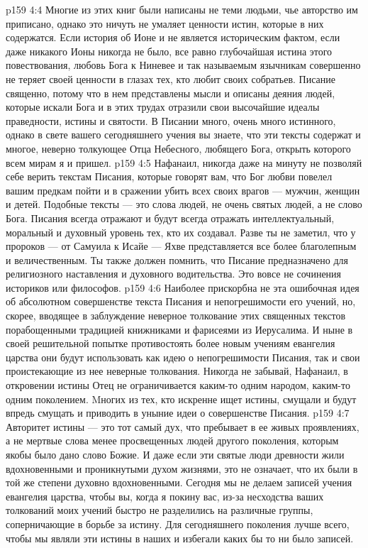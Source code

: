 \vs p159 4:4 Многие из этих книг были написаны не теми людьми, чье авторство им приписано, однако это ничуть не умаляет ценности истин, которые в них содержатся. Если история об Ионе и не является историческим фактом, если даже никакого Ионы никогда не было, все равно глубочайшая истина этого повествования, любовь Бога к Ниневее и так называемым язычникам совершенно не теряет своей ценности в глазах тех, кто любит своих собратьев. Писание священно, потому что в нем представлены мысли и описаны деяния людей, которые искали Бога и в этих трудах отразили свои высочайшие идеалы праведности, истины и святости. В Писании много, очень много истинного, однако в свете вашего сегодняшнего учения вы знаете, что эти тексты содержат и многое, неверно толкующее Отца Небесного, любящего Бога, открыть которого всем мирам я и пришел.
\vs p159 4:5 Нафанаил, никогда даже на минуту не позволяй себе верить текстам Писания, которые говорят вам, что Бог любви повелел вашим предкам пойти и в сражении убить всех своих врагов --- мужчин, женщин и детей. Подобные тексты --- это слова людей, не очень святых людей, а не слово Бога. Писания всегда отражают и будут всегда отражать интеллектуальный, моральный и духовный уровень тех, кто их создавал. Разве ты не заметил, что у пророков --- от Самуила к Исайе --- Яхве представляется все более благолепным и величественным. Ты также должен помнить, что Писание предназначено для религиозного наставления и духовного водительства. Это вовсе не сочинения историков или философов.
\vs p159 4:6 Наиболее прискорбна не эта ошибочная идея об абсолютном совершенстве текста Писания и непогрешимости его учений, но, скорее, вводящее в заблуждение неверное толкование этих священных текстов порабощенными традицией книжниками и фарисеями из Иерусалима. И ныне в своей решительной попытке противостоять более новым учениям евангелия царства они будут использовать как идею о непогрешимости Писания, так и свои проистекающие из нее неверные толкования. Никогда не забывай, Нафанаил, в откровении истины Отец не ограничивается каким\hyp{}то одним народом, каким\hyp{}то одним поколением. Mногих из тех, кто искренне ищет истины, смущали и будут впредь смущать и приводить в уныние идеи о совершенстве Писания.
\vs p159 4:7 Авторитет истины --- это тот самый дух, что пребывает в ее живых проявлениях, а не мертвые слова менее просвещенных людей другого поколения, которым якобы было дано слово Божие. И даже если эти святые люди древности жили вдохновенными и проникнутыми духом жизнями, это не означает, что их  были в той же степени духовно вдохновенными. Сегодня мы не делаем записей учения евангелия царства, чтобы вы, когда я покину вас, из\hyp{}за несходства ваших толкований моих учений быстро не разделились на различные группы, соперничающие в борьбе за истину. Для сегодняшнего поколения лучше всего, чтобы мы являли эти истины в наших  и избегали каких бы то ни было записей.
